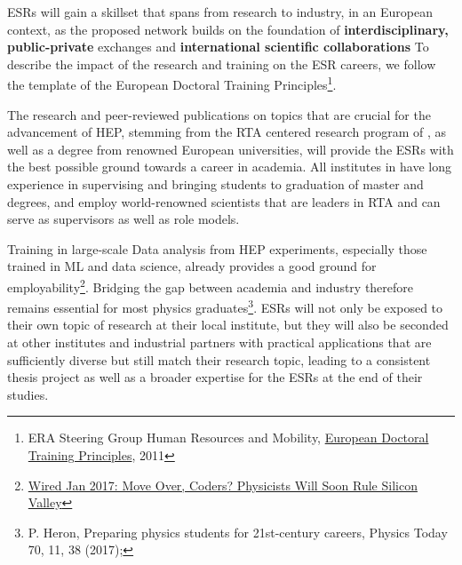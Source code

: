 
ESRs will gain a skillset that spans from research to industry,
in an European context, as the proposed network builds on the foundation of
\textbf{interdisciplinary, public-private} exchanges
and \textbf{international scientific collaborations}
To describe the impact of the research and training on the ESR careers, we follow the template of the European Doctoral Training Principles\footnote{ERA Steering Group Human Resources and Mobility, \href{https://euraxess.ec.europa.eu/belgium/jobs-funding/doctoral-training-principles}{European Doctoral Training Principles}, 2011}. 

\noindent\color{blue}{Research excellence, attractive institutional environment. }\color{black}
The research and peer-reviewed publications on topics that are crucial
for the advancement of HEP, stemming from the RTA centered research program of \acronym,
as well as a \phd degree from renowned European universities, 
will provide the ESRs with the best possible ground towards a career in academia. 
All institutes in \acronym have long
experience in supervising and bringing students to graduation of master and \phd degrees, 
and employ world-renowned scientists that are leaders in RTA and 
can serve as supervisors as well as role models. 

\noindent\color{blue}{Interdisciplinary Research Options, Exposure to Industry and other relevant employment sectors. }\color{black}
Training in large-scale Data analysis from HEP experiments, especially those trained in ML and data science, already provides a good ground for employability\footnote{
\href{https://www.wired.com/2017/01/move-coders-physicists-will-soon-rule-silicon-valley/}{Wired Jan 2017: Move Over, Coders? Physicists Will Soon Rule Silicon Valley}}.
Bridging the gap between academia and industry therefore remains essential for most 
physics graduates\footnote{P. Heron, Preparing physics students for
21st-century careers, Physics Today 70, 11, 38 (2017);}. 
ESRs will not only be exposed to their
own topic of research at their local institute, but they will 
also be seconded at other institutes and industrial partners with practical
applications that are sufficiently diverse but still match
their research topic, leading to a consistent thesis project as well
as a broader expertise for the ESRs at the end of their studies.

